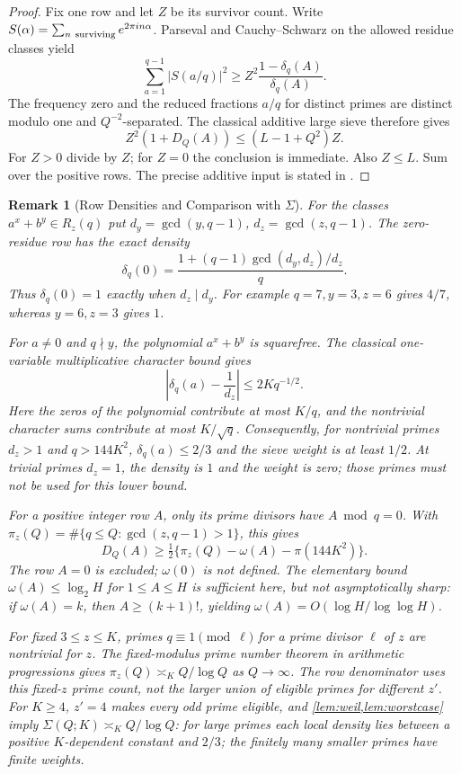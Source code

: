 \documentclass[11pt,a4paper]{article}
\newtheorem{remark}[theorem]{Remark}
\begin{document}
\begin{proof}
Fix one row and let $Z$ be its survivor count. Write
$S(\alpha)=\sum_{n\ {\rm surviving}}e^{2\pi i n\alpha}$.
Parseval and Cauchy--Schwarz on the allowed residue classes yield
\[
 \sum_{a=1}^{q-1}|S(a/q)|^2
       \ge Z^2\frac{1-\delta_q(A)}{\delta_q(A)}.
\]
The frequency zero and the reduced fractions $a/q$ for distinct
primes are distinct modulo one and $Q^{-2}$-separated.
The classical additive large sieve
\cite{Bombieri1971,IwaniecKowalski2004,KedlayaANT} therefore gives
\[
 Z^2(1+D_Q(A))\le(L-1+Q^2)Z.
\]
For $Z>0$ divide by $Z$; for $Z=0$ the conclusion is immediate.
Also $Z\le L$. Sum over the positive rows. The precise additive
input is stated in \cite[Theorem~18.1]{KedlayaANT}.
\end{proof}

\begin{remark}[Row Densities and Comparison with $\Sigma$]
\label{rem:Sigma-comparison}
For the classes $a^x+b^y\in R_z(q)$ put $d_y=\gcd(y,q-1)$,
$d_z=\gcd(z,q-1)$. The zero-residue row has the exact density
\[
 \delta_q(0)=
 \frac{1+(q-1)\gcd(d_y,d_z)/d_z}{q}.
\]
Thus $\delta_q(0)=1$ exactly when $d_z\mid d_y$.
For example $q=7,y=3,z=6$ gives $4/7$, whereas $y=6,z=3$ gives $1$.

For $a\ne0$ and $q\nmid y$, the polynomial $a^x+b^y$ is squarefree.
The classical one-variable multiplicative character bound gives
\[
 \left|\delta_q(a)-\frac1{d_z}\right|\le2Kq^{-1/2}.
\]
Here the zeros of the polynomial contribute at most $K/q$, and the
nontrivial character sums contribute at most $K/\sqrt q$.
Consequently, for \emph{nontrivial} primes $d_z>1$ and
$q>144K^2$, $\delta_q(a)\le2/3$ and the sieve weight is at least
$1/2$. At trivial primes $d_z=1$, the density is $1$ and the weight
is zero; those primes must not be used for this lower bound.

For a positive integer row $A$, only its prime divisors have
$A\bmod q=0$. With
$\pi_z(Q)=\#\{q\le Q:\gcd(z,q-1)>1\}$, this gives
\[
 D_Q(A)\ge
 \tfrac12\{\pi_z(Q)-\omega(A)-\pi(144K^2)\}.
\]
The row $A=0$ is excluded; $\omega(0)$ is not defined.
The elementary bound $\omega(A)\le\log_2 H$ for $1\le A\le H$
is sufficient here, but not asymptotically sharp: if $\omega(A)=k$,
then $A\ge(k+1)!$, yielding
$\omega(A)=O(\log H/\log\log H)$.

For fixed $3\le z\le K$, primes $q\equiv1\pmod{\ell}$ for a prime
divisor $\ell$ of $z$ are nontrivial for $z$.
The fixed-modulus prime number theorem in arithmetic progressions
\cite[Theorem~4.12]{KedlayaANT} gives
$\pi_z(Q)\asymp_K Q/\log Q$ as $Q\to\infty$.
The row denominator uses this \emph{fixed-$z$} prime count, not the
larger union of eligible primes for different $z'$.
For $K\ge4$, $z'=4$ makes every odd prime eligible, and
\cref{lem:weil,lem:worstcase} imply
$\Sigma(Q;K)\asymp_K Q/\log Q$: for large primes each local
density lies between a positive $K$-dependent constant and $2/3$;
the finitely many smaller primes have finite weights.


\end{remark}
\end{document}
